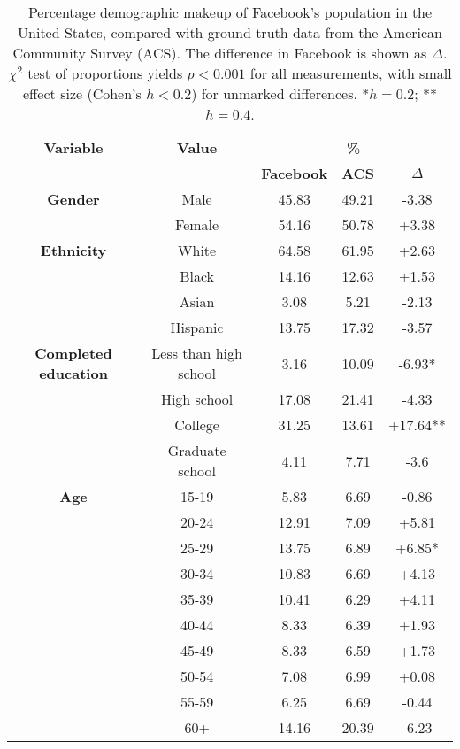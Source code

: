 \begin{table}
\centering
\begin{tabular}{c | c | c | c | c} 
\toprule
\textbf{Variable} & \textbf{Value} & \multicolumn{3}{c}{\textbf{\%}}\\
& & \textbf{Facebook} & \textbf{ACS} & \textbf{$\Delta$}\\
 \hline
\textbf{Gender} & Male & 45.83 & 49.21 & -3.38\\
& Female & 54.16 & 50.78 & +3.38\\
 \midrule
 \textbf{Ethnicity} & White & 64.58 & 61.95 & +2.63\\
 & Black & 14.16 & 12.63 & +1.53\\
 & Asian & 3.08 & 5.21 & -2.13\\
 & Hispanic & 13.75 & 17.32 & -3.57\\
 \midrule
 \textbf{Completed education} & Less than high school & 3.16 & 10.09 & -6.93*\\
 & High school & 17.08 & 21.41 & -4.33\\
 & College & 31.25 & 13.61 & +17.64**\\
 & Graduate school & 4.11 & 7.71 & -3.6\\
 \midrule
 \textbf{Age} & 15-19 & 5.83 & 6.69 & -0.86\\
 & 20-24 & 12.91 & 7.09 & +5.81\\
 & 25-29 & 13.75 & 6.89 & +6.85*\\
 & 30-34 & 10.83 & 6.69 & +4.13\\
 & 35-39 & 10.41 & 6.29 & +4.11\\
 & 40-44 & 8.33 & 6.39 & +1.93\\
 & 45-49 & 8.33 & 6.59 & +1.73\\
 & 50-54 & 7.08 & 6.99 & +0.08\\
 & 55-59 & 6.25 & 6.69 & -0.44\\
 & 60+ & 14.16 & 20.39 & -6.23\\ 
 \bottomrule
\end{tabular}
\caption{Percentage demographic makeup of Facebook's population in the United States, compared with ground truth data from the American Community Survey (ACS). The difference in Facebook is shown as $\Delta$. $\chi^2$ test of proportions yields $p < 0.001$ for all measurements, with small effect size (Cohen's $h < 0.2$) for unmarked differences. *$h = 0.2$; **$h = 0.4$.}
\label{tab:comparison}
\end{table}

